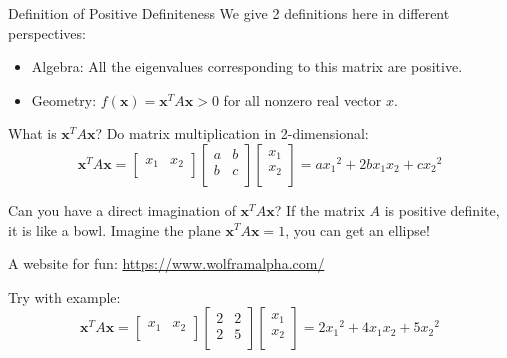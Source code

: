 \documentclass{beamer}
\begin{document}
\begin{frame}{Definition of Positive Definiteness}
We give 2 definitions here in different perspectives:
\begin{itemize}
    \item Algebra: All the eigenvalues corresponding to this matrix are positive.
    \item Geometry: $f\left( \mathbf{x} \right) =\mathbf{x}^TA\mathbf{x}>0$ for all nonzero real vector $x$.
\end{itemize}

What is $\mathbf{x}^TA\mathbf{x}$? Do matrix multiplication in 2-dimensional:
\begin{equation*}
    \mathbf{x}^TA\mathbf{x}=\left[ \begin{matrix}
        x_1&		x_2\\
    \end{matrix} \right] \left[ \begin{matrix}
        a&		b\\
        b&		c\\
    \end{matrix} \right] \left[ \begin{array}{c}
        x_1\\
        x_2\\
    \end{array} \right] ={ax_1}^2+2bx_1x_2+{cx_2}^2
\end{equation*}

Can you have a direct imagination of $\mathbf{x}^TA\mathbf{x}$? If the matrix $A$ is positive definite, it is like a bowl. Imagine the plane $\mathbf{x}^TA\mathbf{x}=1$, you can get an ellipse!

\vspace{3pt}
A website for fun: \url{https://www.wolframalpha.com/}

\vspace{3pt}
Try with example:
\begin{equation*}
    \mathbf{x}^TA\mathbf{x}=\left[ \begin{matrix}
        x_1&		x_2\\
    \end{matrix} \right] \left[ \begin{matrix}
        2&		2\\
        2&		5\\
    \end{matrix} \right] \left[ \begin{array}{c}
        x_1\\
        x_2\\
    \end{array} \right] =2{x_1}^2+4x_1x_2+5{x_2}^2
\end{equation*}
\end{frame}
\end{document}
